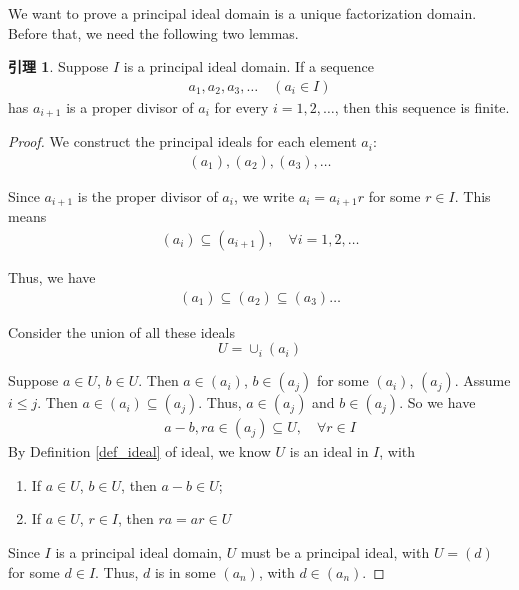 \documentclass[utf8]{ctexbook}
\theoremstyle{definition}
\newtheorem{lemma}{引理}[section]
\begin{document}
We want to prove a principal ideal domain is a unique factorization domain. Before that, we need the following two lemmas.

\begin{lemma}\label{lemma_principal_ideal_domain_UFD_1}
Suppose $I$ is a principal ideal domain. If a sequence
\begin{align*}
a_1, a_2, a_3, \ldots \quad (a_i \in I)
\end{align*}
has $a_{i+1}$ is a proper divisor of $a_{i}$ for every $i = 1, 2, \ldots$, then this sequence is finite.
\end{lemma}

\begin{proof}
We construct the principal ideals for each element $a_i$:
\begin{align*}
(a_1), (a_2), (a_3), \ldots
\end{align*}

Since $a_{i+1}$ is the proper divisor of $a_i$, we write $a_i = a_{i+1} r $ for some $r \in I$. This means
\begin{align*}
(a_{i}) \subseteq (a_{i+1}), \quad \forall i = 1, 2, \ldots
\end{align*}

Thus, we have
\begin{align*}
(a_1) \subseteq (a_2) \subseteq (a_3) \ldots
\end{align*}

Consider the union of all these ideals
\begin{equation}
U = \cup_{i} (a_i)
\end{equation}

Suppose $a \in U$, $b \in U$. Then $a \in (a_i)$, $b \in (a_j)$ for some $(a_i)$, $(a_j)$. Assume $i \leq j$. Then $a \in (a_i) \subseteq (a_j)$. Thus, $a \in (a_j)$ and $b \in (a_j)$. So we have
\begin{align*}
a-b, ra \in (a_j) \subseteq U, \quad \forall r \in I
\end{align*}
By Definition \ref{def_ideal} of ideal, we know $U$ is an ideal in $I$, with
\begin{enumerate}
\item{If $a\in U$, $b \in U$, then $a-b \in U$;}
\item{If $a \in U$, $r \in I$, then $ra = a r \in U$}
\end{enumerate}

Since $I$ is a principal ideal domain, $U$ must be a principal ideal, with $U = (d)$ for some $d \in I$. Thus, $d$ is in some $(a_n)$, with $d \in (a_n)$. 


\end{proof}
\end{document}
